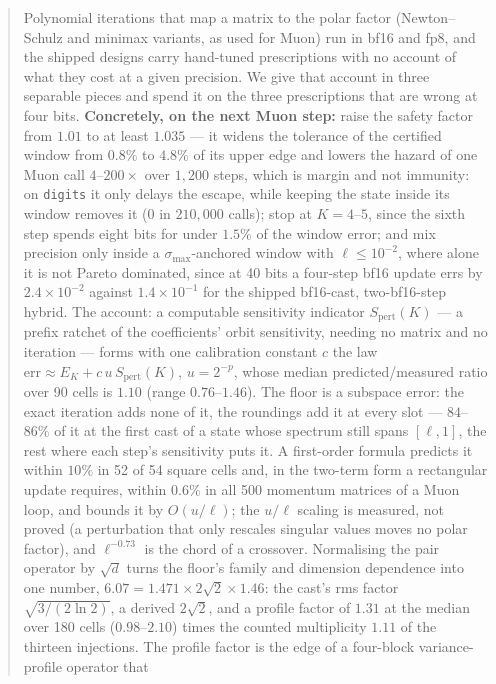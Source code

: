 \begin{abstract}
Polynomial iterations that map a matrix to the polar factor (Newton--Schulz and minimax
variants, as used for Muon) run in bf16 and fp8, and the shipped designs carry
hand-tuned prescriptions with no account of what they cost at a given precision.  We
give that account in three separable pieces and spend it on the
three prescriptions that are wrong at four bits.
\textbf{Concretely, on the next Muon step:} raise the safety factor from $1.01$ to at
least $1.035$ --- it widens the tolerance of the certified window from $0.8\%$ to $4.8\%$
of its upper edge and lowers the hazard of one Muon call $4$--$200\times$ over
$1{,}200$ steps, which is margin and not immunity: on \texttt{digits} it only delays the
escape, while keeping the state inside its window removes it ($0$ in $210{,}000$ calls);
stop at $K=4$--$5$, since the sixth step spends eight bits for under $1.5\%$ of the window
error; and mix precision only inside a $\sigma_{\max}$-anchored window with
$\ell\le10^{-2}$, where alone it is not Pareto dominated, since at 40 bits a four-step bf16
update errs by $2.4\times10^{-2}$ against $1.4\times10^{-1}$ for the shipped bf16-cast,
two-bf16-step hybrid.
The account: a computable sensitivity indicator $S_{\mathrm{pert}}(K)$ --- a prefix
ratchet of the coefficients' orbit sensitivity, needing no matrix and no iteration ---
forms with one calibration constant $c$ the law
$\mathrm{err} \approx E_K + c\,u\,S_{\mathrm{pert}}(K)$, $u = 2^{-p}$, whose median
predicted/measured ratio over 90 cells is $1.10$ (range $0.76$--$1.46$).  The floor is a
subspace error: the exact iteration adds none of it, the roundings add it at every slot ---
$84$--$86\%$ of it at the first cast of a state whose spectrum still spans $[\ell,1]$, the
rest where each step's sensitivity puts it.  A first-order formula
predicts it within $10\%$ in 52 of 54 square cells and, in the two-term form a rectangular
update requires, within $0.6\%$ in all 500 momentum matrices of a Muon loop, and bounds it
by $O(u/\ell)$; the $u/\ell$ scaling is measured, not proved (a perturbation that only
rescales singular values moves no polar factor), and $\ell^{-0.73}$ is the chord of a
crossover.
Normalising the pair operator by $\sqrt d$ turns the floor's family and dimension
dependence into one number, $6.07 = 1.471\times2\sqrt2\times1.46$: the cast's rms factor
$\sqrt{3/(2\ln2)}$, a derived $2\sqrt2$, and a profile factor of $1.31$ at the median over
180 cells ($0.98$--$2.10$) times the counted multiplicity $1.11$ of the thirteen
injections.  The profile factor is the edge of a four-block variance-profile operator that

\end{abstract}
